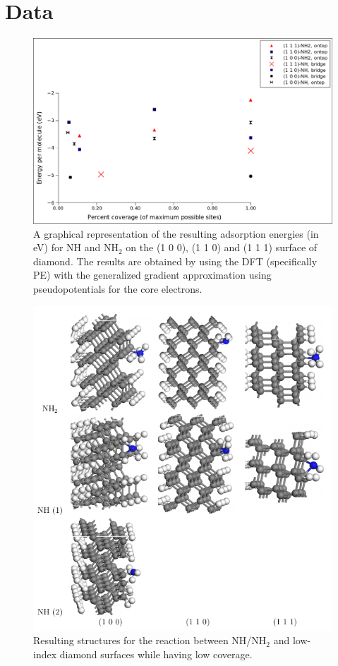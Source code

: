 \documentclass[10pt,a4paper]{article}
\begin{document}
\appendix 
\section{Data}



\begin{figure}[!h] \captionsetup{width=.8\linewidth} \caption{A graphical representation of the resulting adsorption energies (in eV) for NH and NH$_2$ on the (1 0 0), (1 1 0) and (1 1 1) surface of diamond. The results are obtained by using the DFT (specifically PE) with the generalized gradient approximation using pseudopotentials for the core electrons.} \label{NH2diagram}
\includegraphics[width=.8\linewidth]{pictures/NH2diagram.png}
\end{figure}


\begin{figure} \captionsetup{width=.8\linewidth} \caption{Resulting structures for the reaction between NH/NH$_2$ and low-index diamond surfaces while having low coverage.} \label{lowcoverage}
\includegraphics[width=.8\linewidth]{pictures/singleSite_result.png}
\end{figure}
\end{document}

